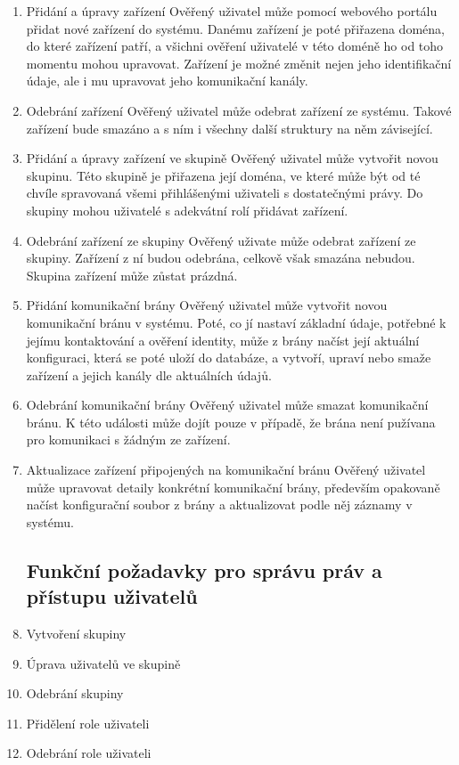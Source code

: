 {\begin{enumerate}
\subsection{Funkční požadavky pro správu zařízení a skupin}
Pro účely následujícího seznamu chápejme pojmem ověřený uživatel uživatele, který je úspěšně přihlášen a systém ověřil, že má na akci, kterou se chystá provést, dostatečná práva.
\item{Přidání a úpravy zařízení}
Ověřený uživatel může pomocí webového portálu přidat nové zařízení do systému. Danému zařízení je poté přiřazena doména, do které zařízení patří, a všichni ověření uživatelé v této doméně ho od toho momentu mohou upravovat. Zařízení je možné změnit nejen jeho identifikační údaje, ale i mu upravovat jeho komunikační kanály.
\item{Odebrání zařízení}
Ověřený uživatel může odebrat zařízení ze systému. Takové zařízení bude smazáno a s ním i všechny další struktury na něm závisející.
\item{Přidání a úpravy zařízení ve skupině}
Ověřený uživatel může vytvořit novou skupinu. Této skupině je přiřazena její doména, ve které může být od té chvíle spravovaná všemi přihlášenými uživateli s dostatečnými právy. Do skupiny mohou uživatelé s adekvátní rolí přidávat zařízení.
\item{Odebrání zařízení ze skupiny}
Ověřený uživate může odebrat zařízení ze skupiny. Zařízení z ní budou odebrána, celkově však smazána nebudou. Skupina zařízení může zůstat prázdná.
\item{Přidání komunikační brány}
Ověřený uživatel může vytvořit novou komunikační bránu v systému. Poté, co jí nastaví základní údaje, potřebné k jejímu kontaktování a ověření identity, může z brány načíst její aktuální konfiguraci, která se poté uloží do databáze, a vytvoří, upraví nebo smaže zařízení a jejich kanály dle aktuálních údajů.
\item{Odebrání komunikační brány}
Ověřený uživatel může smazat komunikační bránu. K této události může dojít pouze v případě, že brána není pužívana pro komunikaci s žádným ze zařízení.
\item{Aktualizace zařízení připojených na komunikační bránu}
Ověřený uživatel může upravovat detaily konkrétní komunikační brány, především opakovaně načíst konfigurační soubor z brány a aktualizovat podle něj záznamy v systému.
\subsection{Funkční požadavky pro správu práv a přístupu uživatelů}
\item{Vytvoření skupiny}
\item{Úprava uživatelů ve skupině}
\item{Odebrání skupiny}
\item{Přidělení role uživateli}
\item{Odebrání role uživateli}
\end{enumerate}
} %

